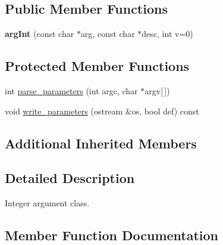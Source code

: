 \subsection*{Public Member Functions}
\begin{DoxyCompactItemize}
\item 
{\bfseries arg\+Int} (const char $\ast$arg, const char $\ast$desc, int v=0)\hypertarget{classclarg_1_1arg_int_aac929eff64f26e154973b504cb085952}{}\label{classclarg_1_1arg_int_aac929eff64f26e154973b504cb085952}

\end{DoxyCompactItemize}
\subsection*{Protected Member Functions}
\begin{DoxyCompactItemize}
\item 
int \hyperlink{classclarg_1_1arg_int_aa65ff016fe6834afd79663c939dc2864}{parse\+\_\+parameters} (int argc, char $\ast$argv\mbox{[}$\,$\mbox{]})
\item 
void \hyperlink{classclarg_1_1arg_int_a907539c5963530661a3df01735d39f37}{write\+\_\+parameters} (ostream \&os, bool def) const 
\end{DoxyCompactItemize}
\subsection*{Additional Inherited Members}


\subsection{Detailed Description}
Integer argument class. 

\subsection{Member Function Documentation}

